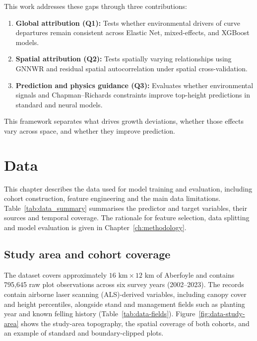 \documentclass[logo,msc,ai]{infthesis}           %
\begin{document}
This work addresses these gaps through three contributions:
\begin{enumerate}
\setlength\itemsep{0pt}
\item \textbf{Global attribution (Q1):} Tests whether environmental drivers of curve departures remain consistent across Elastic Net, mixed-effects, and XGBoost models.
\item \textbf{Spatial attribution (Q2):} Tests spatially varying relationships using GNNWR and residual spatial autocorrelation under spatial cross-validation.
\item \textbf{Prediction and physics guidance (Q3):} Evaluates whether environmental signals and Chapman--Richards constraints improve top-height predictions in standard and neural models.
\end{enumerate}
This framework separates what drives growth deviations, whether those effects vary across space, and whether they improve prediction.

\chapter{Data} \label{ch:data}
This chapter describes the data used for model training and evaluation, including cohort construction, feature engineering and the main data limitations. Table~\ref{tab:data_summary} summarises the predictor and target variables, their sources and temporal coverage. The rationale for feature selection, data splitting and model evaluation is given in Chapter~\ref{ch:methodology}.

\section{Study area and cohort coverage}
The dataset covers approximately $16\text{~km} \times 12\text{~km}$ of Aberfoyle and contains 795,645 raw plot observations across six survey years (2002--2023). The records contain airborne laser scanning (ALS)-derived variables, including canopy cover and height percentiles, alongside stand and management fields such as planting year and known felling history (Table~\ref{tab:data-fields}). 
Figure~\ref{fig:data-study-area} shows the study-area topography, the spatial coverage of both cohorts, and an example of standard and boundary-clipped plots.
\end{document}
